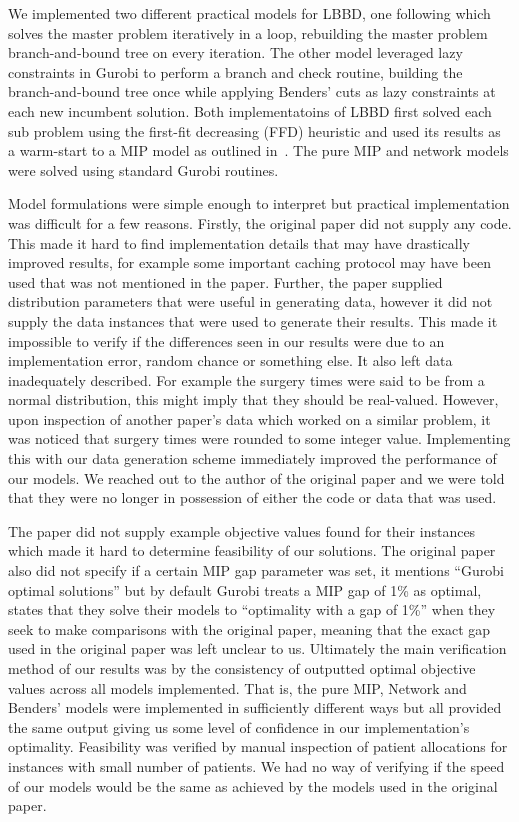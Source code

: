We implemented two different practical models for LBBD, one following\cite{roshanaei2017propagating} which solves the master problem iteratively in a loop, rebuilding the master problem branch-and-bound tree on every iteration. The other model leveraged lazy constraints in Gurobi to perform a branch and check routine\cite{LBBDBible}, building the branch-and-bound tree once while applying Benders' cuts as lazy constraints at each new incumbent solution. Both implementatoins of LBBD first solved each sub problem using the first-fit decreasing (FFD) heuristic\cite{Fazel} and used its results as a warm-start to a MIP model as outlined in~\cite{roshanaei2017propagating}. The pure MIP and network models were solved using standard Gurobi routines. 

Model formulations were simple enough to interpret but practical implementation was difficult for a few reasons. Firstly, the original paper did not supply any code. This made it hard to find implementation details that may have drastically improved results, for example some important caching protocol may have been used that was not mentioned in the paper. Further, the paper supplied distribution parameters that were useful in generating data, however it did not supply the data instances that were used to generate their results. This made it impossible to verify if the differences seen in our results were due to an implementation error, random chance or something else. It also left data inadequately described. For example the surgery times were said to be from a normal distribution, this might imply that they should be real-valued. However, upon inspection of another paper's data which worked on a similar problem\cite{guo}, it was noticed that surgery times were rounded to some integer value. Implementing this with our data generation scheme immediately improved the performance of our models. We reached out to the author of the original paper and we were told that they were no longer in possession of either the code or data that was used. 

The paper did not supply example objective values found for their instances which made it hard to determine feasibility of our solutions. The original paper also did not specify if a certain MIP gap parameter was set, it mentions ``Gurobi optimal solutions'' but by default Gurobi treats a MIP gap of 1\% as optimal,~\cite{guo} states that they solve their models to ``optimality with a gap of 1\%'' when they seek to make comparisons with the original paper, meaning that the exact gap used in the original paper was left unclear to us. Ultimately the main verification method of our results was by the consistency of outputted optimal objective values across all models implemented. That is, the pure MIP, Network and Benders' models were implemented in sufficiently different ways but all provided the same output giving us some level of confidence in our implementation's optimality. Feasibility was verified by manual inspection of patient allocations for instances with small number of patients. We had no way of verifying if the speed of our models would be the same as achieved by the models used in the original paper.
